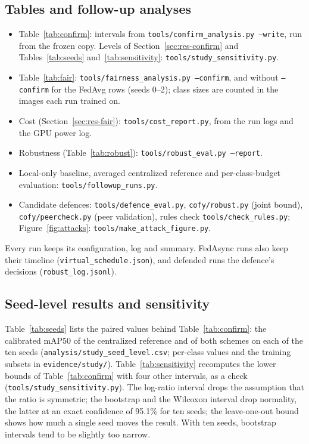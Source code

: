\documentclass[pdflatex,sn-mathphys-num]{sn-jnl}
\begin{document}
\begin{appendices}
\subsection{Tables and follow-up analyses}

\begin{itemize}
\item Table~\ref{tab:confirm}: intervals from \texttt{tools/confirm\_analysis.py --write}, run from the frozen copy. Levels of Section~\ref{sec:res-confirm} and Tables~\ref{tab:seeds} and~\ref{tab:sensitivity}: \texttt{tools/study\_sensitivity.py}.
\item Table~\ref{tab:fair}: \texttt{tools/fairness\_analysis.py --confirm}, and without \texttt{--confirm} for the FedAvg rows (seeds 0--2); class sizes are counted in the images each run trained on.
\item Cost (Section~\ref{sec:res-fair}): \texttt{tools/cost\_report.py}, from the run logs and the GPU power log.
\item Robustness (Table~\ref{tab:robust}): \texttt{tools/robust\_eval.py --report}.
\item Local-only baseline, averaged centralized reference and per-class-budget evaluation: \texttt{tools/followup\_runs.py}.
\item Candidate defences: \texttt{tools/defence\_eval.py}, \texttt{cofy/robust.py} (joint bound), \texttt{cofy/peercheck.py} (peer validation), rules check \texttt{tools/check\_rules.py}; Figure~\ref{fig:attacks}: \texttt{tools/make\_attack\_figure.py}.
\end{itemize}
Every run keeps its configuration, log and summary. FedAsync runs also keep their timeline (\texttt{virtual\_schedule.json}), and defended runs the defence's decisions (\texttt{robust\_log.jsonl}).

\subsection{Seed-level results and sensitivity}\label{app:seeds}
Table~\ref{tab:seeds} lists the paired values behind Table~\ref{tab:confirm}: the calibrated mAP50 of the centralized reference and of both schemes on each of the ten seeds (\texttt{analysis/study\_seed\_level.csv}; per-class values and the training subsets in \texttt{evidence/study/}). Table~\ref{tab:sensitivity} recomputes the lower bounds of Table~\ref{tab:confirm} with four other intervals, as a check (\texttt{tools/study\_sensitivity.py}). The log-ratio interval drops the assumption that the ratio is symmetric; the bootstrap and the Wilcoxon interval drop normality, the latter at an exact confidence of 95.1\% for ten seeds; the leave-one-out bound shows how much a single seed moves the result. With ten seeds, bootstrap intervals tend to be slightly too narrow.


\end{appendices}
\end{document}
